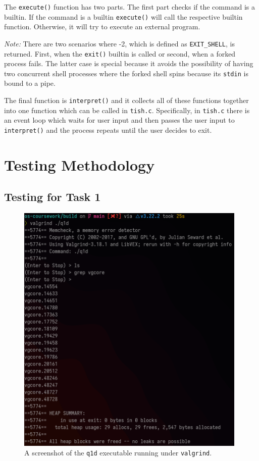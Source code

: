 \documentclass[12pt]{article}
\begin{document}
The \texttt{execute()} function has two parts. The first part
checks if the command is a builtin. If the command is a builtin
\texttt{execute()} will call the respective builtin function.
Otherwise, it will try to execute an external program.

\textit{Note:} There are two scenarios where -2, which is
defined as \texttt{EXIT\_SHELL}, is returned. First, when the
\texttt{exit()} builtin is called or second, when a forked
process fails. The latter case is special because it avoids the
possibility of having two concurrent shell processes where the
forked shell spins because its \texttt{stdin} is bound to a
pipe.

The final function is \texttt{interpret()} and it collects all
of these functions together into one function which can be
called in \texttt{tish.c}. Specifically, in \texttt{tish.c}
there is an event loop which waits for user input and then
passes the user input to \texttt{interpret()} and the process
repeats until the user decides to exit.

\section{Testing Methodology}

\subsection{Testing for Task 1}

\begin{figure}[H]
\centering
\includegraphics[width=11cm]{q1d-test}
\caption{A screenshot of the \texttt{q1d} executable running
under \texttt{valgrind}.}
\end{figure}
\end{document}
